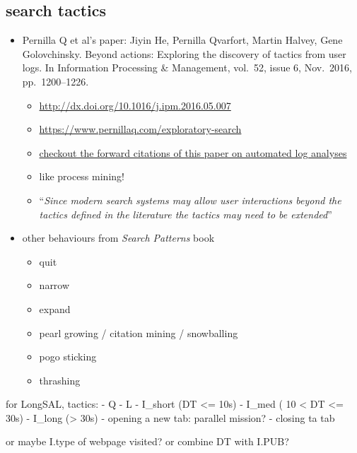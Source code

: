 \documentclass[letterpaper, nobind]{templates/ociamthesis}
\providecommand{\tightlist}{%
  \setlength{\itemsep}{0pt}\setlength{\parskip}{0pt}}
\begin{document}
\hypertarget{search-tactics}{%
\subsection{search tactics}\label{search-tactics}}

\begin{itemize}
\tightlist
\item
  Pernilla Q et al's paper: Jiyin He, Pernilla Qvarfort, Martin Halvey, Gene Golovchinsky. Beyond actions: Exploring the discovery of tactics from user logs. In Information Processing \& Management, vol.~52, issue 6, Nov.~2016, pp.~1200--1226.

  \begin{itemize}
  \tightlist
  \item
    \url{http://dx.doi.org/10.1016/j.ipm.2016.05.007}
  \item
    \url{https://www.pernillaq.com/exploratory-search}
  \item
    \href{https://scholar.google.com/scholar?cites=16001618163231710088\&as_sdt=5,44\&sciodt=0,44\&hl=en}{checkout the forward citations of this paper on automated log analyses}
  \item
    like process mining!
  \item
    ``\emph{Since modern search systems may allow user interactions beyond the tactics defined in the literature the tactics may need to be extended}''
  \end{itemize}
\item
  other behaviours from \emph{Search Patterns} book

  \begin{itemize}
  \tightlist
  \item
    quit
  \item
    narrow
  \item
    expand
  \item
    pearl growing / citation mining / snowballing
  \item
    pogo sticking
  \item
    thrashing
  \end{itemize}
\end{itemize}

for LongSAL, tactics:
- Q
- L
- I\_short (DT \textless= 10s)
- I\_med ( 10 \textless{} DT \textless= 30s)
- I\_long (\textgreater{} 30s)
- opening a new tab: parallel mission?
- closing ta tab

or maybe I.type of webpage visited?
or combine DT with I.PUB?
\end{document}
